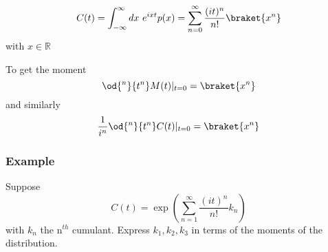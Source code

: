 \[C(t) = \int_{-\infty}^{\infty} dx \, \, e^{ixt} p(x) = \sum_{n=0}^{\infty} \frac{(it)^n}{n!} \braket{x^n}\] with $x \in \mathbb{R}$

To get the moment $$\od{^n}{t^n} M(t)|_{t=0} = \braket{x^n}$$ and similarly $$\frac{1}{i^n} \od{^n}{t^n} C(t)|_{t=0} = \braket{x^n}$$

\subsubsection*{Example}

Suppose $$C(t) = \exp \left(\sum_{n=1}^{\infty} \frac{(it)^n}{n!} k_n\right)$$ with $k_n$ the n$^{th}$ cumulant. Express $k_1, k_2, k_3$ in terms of the moments of the distribution.